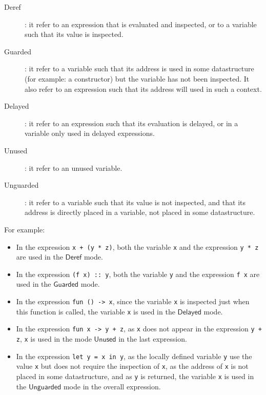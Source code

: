 \documentclass{article}
\newcommand{\Deref}{\mathsf{Deref}}
\newcommand{\Unguarded}{\mathsf{Unguarded}}
\newcommand{\Guarded}{\mathsf{Guarded}}
\newcommand{\Delayed}{\mathsf{Delayed}}
\newcommand{\Unused}{\mathsf{Unused}}
\begin{document}
\begin{description}
  \item[Deref]: it refer to an expression that is evaluated and inspected, or to
    a variable such that its value is inspected.
  \item[Guarded]: it refer to a variable such that its address is used in some
    datastructure (for example: a constructor) but the variable has not been
    inspected. It also refer to an expression such that its address will used
    in such a context.
  \item[Delayed]: it refer to an expression such that its evaluation is delayed,
    or in a variable only used in delayed expressions.
  \item[Unused]: it refer to an unused variable.
  \item[Unguarded]: it refer to a variable such that its value is not inspected,
    and that its address is directly placed in a variable, not placed in some
    datastructure.
\end{description}

For example:
\begin{itemize}
  \item In the expression \lstinline|x + (y * z)|, both the variable
    \lstinline|x| and the expression \lstinline|y * z| are used in the $\Deref$
    mode.
  \item In the expression \lstinline|(f x) :: y|, both the variable
    \lstinline|y| and the expression \lstinline|f x| are used in the $\Guarded$
    mode.
  \item In the expression \lstinline|fun () -> x|, since the variable
    \lstinline|x| is inspected just when this function is called, the variable
    \lstinline|x| is used in the $\Delayed$ mode.
  \item In the expression \lstinline|fun x -> y + z|, as \lstinline|x| does not
    appear in the expression \lstinline|y + z|, \lstinline|x| is used in the
    mode $\Unused$ in the last expression.
  \item In the expression \lstinline|let y = x in y|, as the locally defined
    variable \lstinline|y| use the value \lstinline|x| but does not require the
    inspection of \lstinline|x|, as the address of \lstinline|x| is not placed
    in some datastructure, and as \lstinline|y| is returned, the variable
    \lstinline|x| is used in the $\Unguarded$ mode in the overall expression.

\end{itemize}
\end{document}
